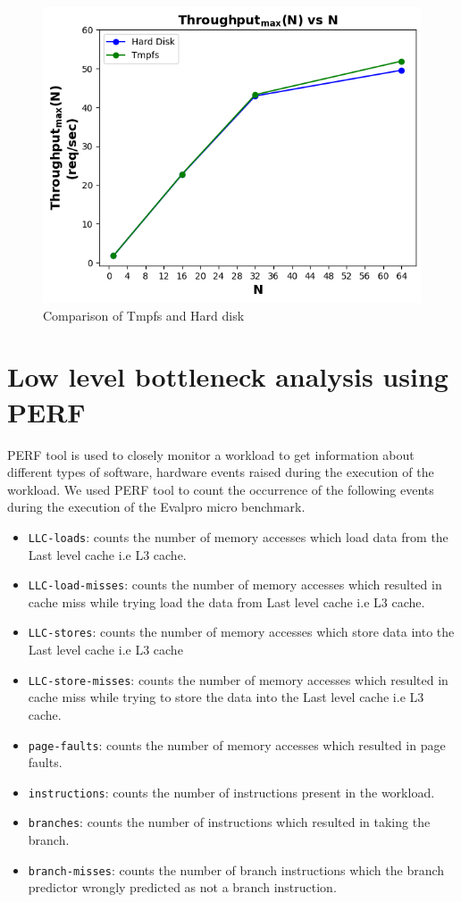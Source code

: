 \documentclass{iitbreport}
\begin{document}
\begin{figure}[!htb]
  \centering
  \includegraphics[width=\linewidth]{Images/hard_disk_tmpfs_comparision.png}
  \caption{ Comparison of Tmpfs and Hard disk}
  \label{evalpro_micro_benchmark_tmpfs_comparision}
\end{figure}

\section{Low level bottleneck analysis using PERF}\label{low_level_bottleneck_analysis}

PERF \cite{PERF} tool  is used to closely monitor a workload to get information about different types of software, hardware events raised during the execution of the workload. We used  PERF tool to count the occurrence of the following events during the execution of the Evalpro micro benchmark.
\begin{itemize}
\item {\texttt{LLC-loads}}: counts the number of memory accesses which load data from the  Last level cache  i.e L3 cache.
 \item {\texttt{LLC-load-misses}}: counts the number of memory accesses which resulted in cache miss while trying load  the data from Last level cache  i.e L3 cache.
\item {\texttt{LLC-stores}}:  counts the number of memory accesses which store data into the  Last level cache  i.e L3 cache 
\item {\texttt{LLC-store-misses}}: counts the number of memory accesses which resulted in cache miss while trying to store  the data into the Last level cache  i.e L3 cache.
\item {\texttt{page-faults}}: counts the number of memory accesses which resulted in page faults.
\item {\texttt{instructions}}: counts the number of instructions present in the workload.
\item {\texttt{branches}}: counts the number of instructions which resulted in taking the branch.
\item {\texttt{branch-misses}}: counts the number of branch instructions which the branch predictor wrongly predicted as not a branch instruction.
\end{itemize}
\end{document}
